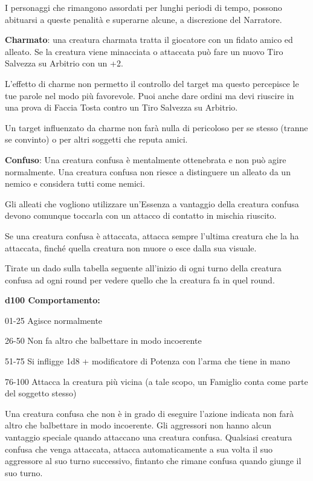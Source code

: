 \documentclass[a4paper,11pt,twoside,openany]{book}
\begin{document}
{I personaggi che rimangono assordati per lunghi periodi di tempo, possono abituarsi a queste penalità e superarne alcune, a discrezione del Narratore.

\textbf{Charmato}: una creatura charmata tratta il giocatore con un fidato amico ed alleato. Se la creatura viene minacciata o attaccata può fare un nuovo Tiro Salvezza su Arbitrio con un +2.

L'effetto di charme non permetto il controllo del target ma questo percepisce le tue parole nel modo più favorevole. Puoi anche dare ordini ma devi riuscire in una prova di Faccia Tosta contro un Tiro Salvezza su Arbitrio.

Un target influenzato da charme non farà nulla di pericoloso per se stesso (tranne se convinto) o per altri soggetti che reputa amici.

\textbf{Confuso}: Una creatura confusa è mentalmente ottenebrata e non può agire normalmente. Una creatura confusa non riesce a distinguere un alleato da un nemico e considera tutti come nemici.

Gli alleati che vogliono utilizzare un'Essenza a vantaggio della creatura confusa devono comunque toccarla con un attacco di contatto in mischia riuscito.

Se una creatura confusa è attaccata, attacca sempre l'ultima creatura che la ha attaccata, finché quella creatura non muore o esce dalla sua visuale.

Tirate un dado sulla tabella seguente all'inizio di ogni turno della
creatura confusa ad ogni round per vedere quello che la creatura fa
in quel round.

\textbf{d100 Comportamento:}

01-25 Agisce normalmente

26-50 Non fa altro che balbettare in modo incoerente

51-75 Si infligge 1d8 + modificatore di Potenza con l'arma che tiene in mano

76-100 Attacca la creatura più vicina (a tale scopo, un Famiglio conta come parte del soggetto stesso)

Una creatura confusa che non è in grado di eseguire l'azione indicata non farà altro che balbettare in modo incoerente. Gli aggressori non hanno alcun vantaggio speciale quando attaccano una creatura confusa. Qualsiasi creatura confusa che venga attaccata, attacca automaticamente a sua volta il suo aggressore al suo turno successivo, fintanto che rimane confusa quando giunge il suo turno.

}
\end{document}
